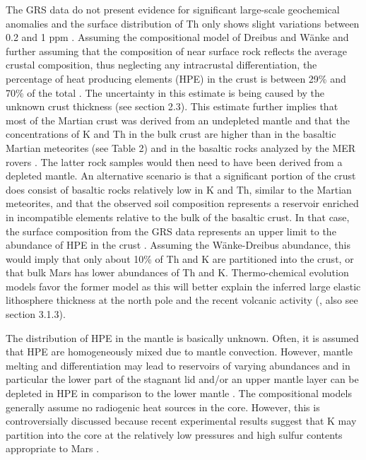 The GRS data do not present evidence for significant large-scale geochemical anomalies \citep{Hahn2011} and the surface distribution of Th only shows slight variations between 0.2 and 1 ppm \citep{Taylor2007}. Assuming the compositional model of Dreibus and W\"anke and further assuming that the composition of near surface rock reflects the average crustal composition, thus neglecting any intracrustal differentiation, the percentage of heat producing elements (HPE) in the crust is between 29\% and 70\% of the total \citep{Taylor2007}.  The uncertainty in this estimate is being caused by the unknown crust thickness (see section 2.3). This estimate further implies that most of the Martian crust was derived from an undepleted mantle and that the concentrations of K and Th in the bulk crust are higher than in the basaltic Martian meteorites (see Table 2) and in the basaltic rocks analyzed by the MER rovers \citep[e.g.,][]{ McLennan2001}. The latter rock samples would then need to have been derived from a depleted mantle. An alternative scenario is that a significant portion of the crust does consist of basaltic rocks relatively low in K and Th, similar to the Martian meteorites, and that the observed soil composition represents a reservoir enriched in incompatible elements relative to the bulk of the basaltic crust. In that case, the surface composition from the GRS data represents an upper limit to the abundance of HPE in the crust \citep{Newsom2007}. Assuming the W\"anke-Dreibus abundance, this would imply that only about 10\% of Th and K are partitioned into the crust, or that bulk Mars has lower abundances of Th and K.  Thermo-chemical evolution models favor the former model as this will better explain the inferred large elastic lithosphere thickness at the north pole and the recent volcanic activity (\cite{Kiefer2003}, also see section 3.1.3). 

The distribution of HPE in the mantle is basically unknown. Often, it is assumed that HPE are homogeneously mixed due to mantle convection. However, mantle melting and differentiation may lead to reservoirs of varying abundances and in particular the lower part of the stagnant lid and/or an upper mantle layer can be depleted in HPE in comparison to the lower mantle \citep{Ruedas2013, Plesa2014a}. 
The compositional models generally assume no radiogenic heat sources in the core. However, this is controversially discussed because recent experimental results suggest that K may partition into the core at the relatively low pressures and high sulfur contents appropriate to Mars \citep{Murthy2003}.

